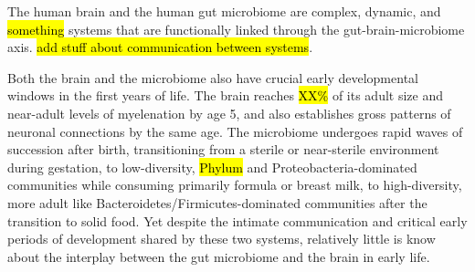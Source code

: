 The human brain and the human gut microbiome
are complex, dynamic, and \hl{something} systems
that are functionally linked through the gut-brain-microbiome axis.
\hl{add stuff about communication between systems}.

Both the brain and the microbiome also have crucial
early developmental windows in the first years of life.
The brain reaches \hl{XX\%} of its adult size
and near-adult levels of myelenation by age 5,
and also establishes gross patterns of neuronal connections
by the same age.
The microbiome undergoes rapid waves of succession after birth,
transitioning from a sterile or near-sterile environment during gestation,
to low-diversity, \hl{Phylum} and Proteobacteria-dominated communities
while consuming primarily formula or breast milk,
to high-diversity, more adult like Bacteroidetes/Firmicutes-dominated
communities after the transition to solid food.
Yet despite the intimate communication
and critical early periods of development shared by these two systems,
relatively little is know about the interplay
between the gut microbiome and the brain in early life.
